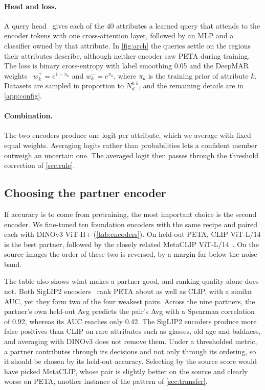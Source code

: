 \documentclass[10pt,twocolumn,letterpaper]{article}
\begin{document}
\paragraph{Head and loss.} A query head~\cite{q2l,mldecoder} gives each of the 40 attributes a learned query that attends to the encoder tokens with one cross-attention layer, followed by an MLP and a classifier owned by that attribute. In \cref{fig:arch} the queries settle on the regions their attributes describe, although neither encoder saw PETA during training. The loss is binary cross-entropy with label smoothing 0.05 and the DeepMAR weights~\cite{deepmar} $w_k^{+}=e^{1-\pi_k}$ and $w_k^{-}=e^{\pi_k}$, where $\pi_k$ is the training prior of attribute $k$. Datasets are sampled in proportion to $N_d^{0.5}$, and the remaining details are in \cref{app:config}.

\paragraph{Combination.} The two encoders produce one logit per attribute, which we average with fixed equal weights. Averaging logits rather than probabilities lets a confident member outweigh an uncertain one. The averaged logit then passes through the threshold correction of \cref{sec:rule}.


\subsection{Choosing the partner encoder}
\label{sec:pairing}

If accuracy is to come from pretraining, the most important choice is the second encoder. We fine-tuned ten foundation encoders with the same recipe and paired each with DINOv3 ViT-H+ (\cref{tab:encoders}). On held-out PETA, CLIP ViT-L/14 is the best partner, followed by the closely related MetaCLIP ViT-L/14~\cite{metaclip}. On the source images the order of these two is reversed, by a margin far below the noise band.

The table also shows what makes a partner good, and ranking quality alone does not. Both SigLIP2 encoders~\cite{siglip2} rank PETA about as well as CLIP, with a similar AUC, yet they form two of the four weakest pairs. Across the nine partners, the partner's own held-out Avg predicts the pair's Avg with a Spearman correlation of 0.92, whereas its AUC reaches only 0.42. The SigLIP2 encoders produce more false positives than CLIP on rare attributes such as glasses, old age and baldness, and averaging with DINOv3 does not remove them. Under a thresholded metric, a partner contributes through its decisions and not only through its ordering, so it should be chosen by its held-out accuracy. Selecting by the source score would have picked MetaCLIP, whose pair is slightly better on the source and clearly worse on PETA, another instance of the pattern of \cref{sec:transfer}.
\end{document}
